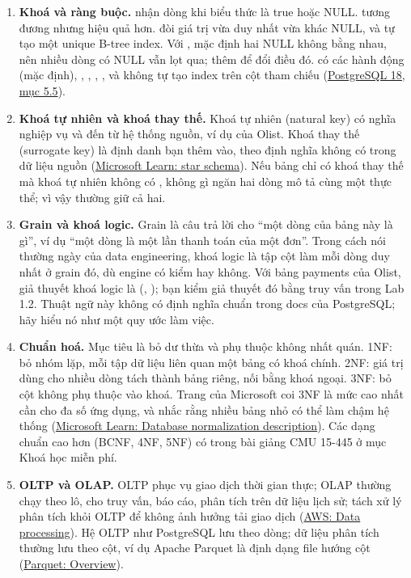 \begin{enumerate}[resume]
  \item \textbf{Khoá và ràng buộc.}  nhận dòng khi biểu thức là true hoặc NULL.  tương đương  nhưng hiệu quả hơn.  đòi giá trị vừa duy nhất vừa khác NULL, và tự tạo một unique B-tree index. Với , mặc định hai NULL không bằng nhau, nên nhiều dòng có NULL vẫn lọt qua; thêm  để đổi điều đó.  có các hành động  (mặc định), , , , , và không tự tạo index trên cột tham chiếu (\href{https://www.postgresql.org/docs/current/ddl-constraints.html}{PostgreSQL 18, mục 5.5}).
  \item \textbf{Khoá tự nhiên và khoá thay thế.} Khoá tự nhiên (natural key) có nghĩa nghiệp vụ và đến từ hệ thống nguồn, ví dụ  của Olist. Khoá thay thế (surrogate key) là định danh bạn thêm vào, theo định nghĩa không có trong dữ liệu nguồn (\href{https://learn.microsoft.com/en-us/power-bi/guidance/star-schema}{Microsoft Learn: star schema}). Nếu bảng chỉ có khoá thay thế mà khoá tự nhiên không có , không gì ngăn hai dòng mô tả cùng một thực thể; vì vậy thường giữ cả hai.
  \item \textbf{Grain và khoá logic.} Grain là câu trả lời cho “một dòng của bảng này là gì”, ví dụ “một dòng là một lần thanh toán của một đơn”. Trong cách nói thường ngày của data engineering, khoá logic là tập cột làm mỗi dòng duy nhất ở grain đó, dù engine có kiểm hay không. Với bảng payments của Olist, giả thuyết khoá logic là (, ); bạn kiểm giả thuyết đó bằng truy vấn trong Lab 1.2. Thuật ngữ này không có định nghĩa chuẩn trong docs của PostgreSQL; hãy hiểu nó như một quy ước làm việc.
  \item \textbf{Chuẩn hoá.} Mục tiêu là bỏ dư thừa và phụ thuộc không nhất quán. 1NF: bỏ nhóm lặp, mỗi tập dữ liệu liên quan một bảng có khoá chính. 2NF: giá trị dùng cho nhiều dòng tách thành bảng riêng, nối bằng khoá ngoại. 3NF: bỏ cột không phụ thuộc vào khoá. Trang của Microsoft coi 3NF là mức cao nhất cần cho đa số ứng dụng, và nhắc rằng nhiều bảng nhỏ có thể làm chậm hệ thống (\href{https://learn.microsoft.com/en-us/troubleshoot/office/access/database-normalization-description}{Microsoft Learn: Database normalization description}). Các dạng chuẩn cao hơn (BCNF, 4NF, 5NF) có trong bài giảng CMU 15-445 ở mục Khoá học miễn phí.
  \item \textbf{OLTP và OLAP.} OLTP phục vụ giao dịch thời gian thực; OLAP thường chạy theo lô, cho truy vấn, báo cáo, phân tích trên dữ liệu lịch sử; tách xử lý phân tích khỏi OLTP để không ảnh hưởng tải giao dịch (\href{https://docs.aws.amazon.com/whitepapers/latest/data-warehousing-on-aws/data-processing.html}{AWS: Data processing}). Hệ OLTP như PostgreSQL lưu theo dòng; dữ liệu phân tích thường lưu theo cột, ví dụ Apache Parquet là định dạng file hướng cột (\href{https://parquet.apache.org/docs/overview/}{Parquet: Overview}).
\end{enumerate}

